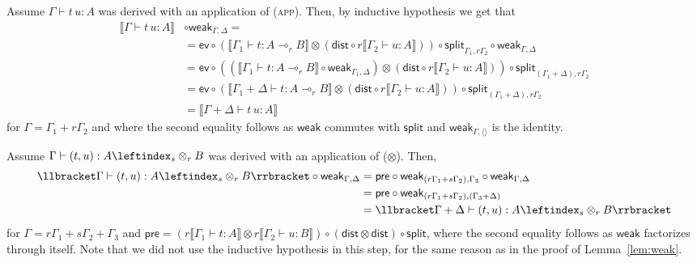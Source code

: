 \documentclass[a4paper,UKenglish,cleveref, autoref, thm-restate]{lipics-v2021}
\newcommand{\lol}{\mathbin{\multimap}}
\newcommand{\mprod}{\otimes}
\newcommand{\emptyctx}{\langle\rangle}
\newcommand{\pair}[2]{\otimes_{#1,#2}}
\renewcommand{\pair}[2]{\leftindex_{#1}\otimes_{#2}} %
\newcommand{\splt}{\mathsf{split}}
\newcommand{\distribute}{\mathsf{dist}}
\newcommand{\semweak}{\mathsf{weak}}
\newcommand{\ts}{\vdash}
\newcommand{\hastype}[3]{#1\ts #2 : #3}
\newcommand{\eval}{\mathsf{ev}}
\newcommand{\den}[1]{\llbracket #1\rrbracket}
\begin{document}
\begin{description}[wide, font=\sc]
\item[Case (app):] Assume $\hastype{\Gamma}{t\,u}{A}$ was derived with an application of (\textsc{app}). Then, by inductive hypothesis we get that
\begin{align*}
\den{\hastype{\Gamma}{t\,u}{A}} &\circ \semweak_{\Gamma,\Delta} = {} \\
&= \eval \circ (\den{\hastype{\Gamma_1}{t}{A \lol_r B}} \mprod (\distribute\circ r\den{\hastype{\Gamma_2}{u}{A}})) \circ \splt_{\Gamma_1,r\Gamma_2} \circ \semweak_{\Gamma,\Delta} \\
&= \eval \circ ((\den{\hastype{\Gamma_1}{t}{A \lol_r B}}\circ \semweak_{\Gamma_1,\Delta}) \mprod (\distribute\circ r\den{\hastype{\Gamma_2}{u}{A}})) \circ \splt_{(\Gamma_1+\Delta),r\Gamma_2} \\
&= \eval \circ (\den{\hastype{\Gamma_1+\Delta}{t}{A \lol_r B}} \mprod 
 (\distribute\circ r\den{\hastype{\Gamma_2}{u}{A}})) \circ \splt_{(\Gamma_1+\Delta),r\Gamma_2} \\
&=\den{\hastype{\Gamma+\Delta}{t\,u}{A}}
\end{align*}
for $\Gamma = \Gamma_1 + r\Gamma_2$ and where the second equality follows as $\semweak$ commutes with $\splt$ and $\semweak_{\Gamma,\emptyctx}$ is the identity.

\item[Case ($\mprod$):] Assume $\hastype{\Gamma}{(t,u)}{A \pair sr B}$ was derived with an application of ($\mprod$). Then,
\begin{align*}
\den{\hastype{\Gamma}{(t,u)}{A \pair sr B}} \circ \semweak_{\Gamma,\Delta}
&= \mathsf{pre} \circ \semweak_{(r\Gamma_1+s\Gamma_2),\Gamma_3} \circ \semweak_{\Gamma,\Delta} \\
&= \mathsf{pre} \circ \semweak_{(r\Gamma_1+s\Gamma_2),(\Gamma_3+\Delta)}\\
&=\den{\hastype{\Gamma+\Delta}{(t,u)}{A \pair sr B}}
\end{align*}
for $\Gamma = r\Gamma_1+s\Gamma_2+\Gamma_3$ and $\mathsf{pre} = (r\den{\hastype{\Gamma_1}{t}{A}} \mprod r\den{\hastype{\Gamma_2}{u}{B}}) \circ
(\distribute\mprod\distribute)\circ\splt$, where the second equality follows as $\semweak$ factorizes through itself.
Note that we did not use the inductive hypothesis in this step, for the same reason as in the proof of Lemma~\ref{lem:weak}.


\end{description}
\end{document}
